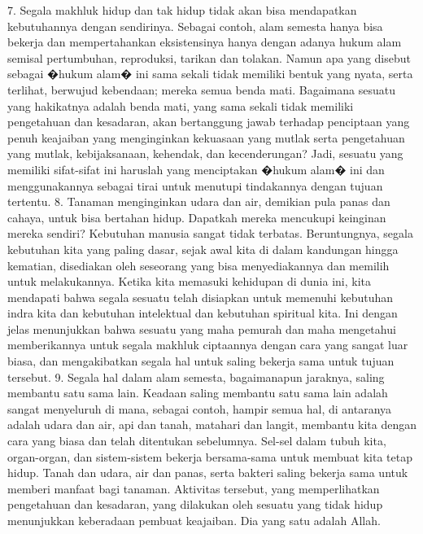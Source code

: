\documentclass[]{article}
\begin{document}
7. Segala makhluk hidup dan tak hidup tidak akan bisa mendapatkan kebutuhannya dengan sendirinya. Sebagai contoh, alam semesta hanya bisa bekerja dan mempertahankan eksistensinya hanya dengan adanya hukum alam semisal pertumbuhan, reproduksi, tarikan dan tolakan. Namun apa yang disebut sebagai �hukum alam� ini sama sekali tidak memiliki bentuk yang nyata, serta terlihat, berwujud kebendaan; mereka semua benda mati.  Bagaimana sesuatu yang hakikatnya adalah benda mati, yang sama sekali tidak memiliki pengetahuan dan kesadaran, akan bertanggung jawab terhadap penciptaan yang penuh keajaiban yang menginginkan kekuasaan yang mutlak serta pengetahuan yang mutlak, kebijaksanaan, kehendak, dan kecenderungan? Jadi, sesuatu yang memiliki sifat-sifat ini haruslah yang menciptakan �hukum alam� ini dan menggunakannya sebagai tirai untuk menutupi tindakannya dengan tujuan tertentu.
8. Tanaman menginginkan udara dan air, demikian pula panas dan cahaya, untuk bisa bertahan hidup. Dapatkah mereka mencukupi keinginan mereka sendiri? Kebutuhan manusia sangat tidak terbatas. Beruntungnya, segala kebutuhan kita yang paling dasar, sejak awal kita di dalam kandungan hingga kematian, disediakan oleh seseorang yang bisa menyediakannya dan memilih untuk melakukannya. Ketika kita memasuki kehidupan di dunia ini, kita mendapati bahwa segala sesuatu telah disiapkan untuk memenuhi kebutuhan indra kita dan kebutuhan intelektual dan kebutuhan spiritual kita. Ini dengan jelas menunjukkan bahwa sesuatu yang maha pemurah dan maha mengetahui memberikannya untuk segala makhluk ciptaannya dengan cara yang sangat luar biasa, dan mengakibatkan segala hal untuk saling bekerja sama untuk tujuan tersebut.
9. Segala hal dalam alam semesta, bagaimanapun jaraknya, saling membantu satu sama lain. Keadaan saling membantu satu sama lain adalah sangat menyeluruh di mana, sebagai contoh, hampir semua hal, di antaranya adalah udara dan air, api dan tanah, matahari dan langit, membantu kita dengan cara yang  biasa dan telah ditentukan sebelumnya. Sel-sel dalam tubuh kita, organ-organ, dan sistem-sistem bekerja bersama-sama untuk membuat kita tetap hidup. Tanah dan udara, air dan panas, serta bakteri saling bekerja sama untuk memberi manfaat bagi tanaman. Aktivitas tersebut, yang memperlihatkan pengetahuan dan kesadaran, yang dilakukan oleh sesuatu yang tidak hidup menunjukkan keberadaan pembuat keajaiban. Dia yang satu adalah Allah.
\end{document}
